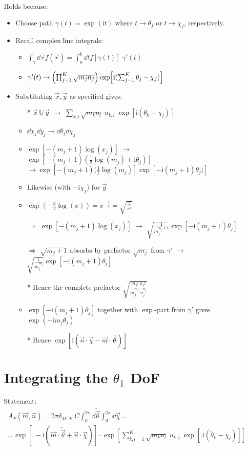 \documentclass[
	english,
	a4paper,
	fontsize=10pt,
	parskip=half,
	titlepage=true,
	DIV=12,
	final
]{scrreprt}
\newcommand*{\thus}{\ensuremath{\rightarrow}\xspace}
\newcommand*{\Thus}{\ensuremath{\Rightarrow}\xspace}
\newcommand*{\iunit}{\ensuremath{\mathrm{i}}}
\begin{document}
Holds because:
\begin{itemize}
\item Choose path $\gamma(t) = \exp(\iunit t)$ where $t \thus \theta_j$ or $t \thus \chi_j$,
	respectively.
\item Recall complex line integrals:
	\begin{itemize}
	\item $\int_{\gamma} \dd{\vec{r}} f(\vec{r})
		=
		\int_{a}^{b} \dd{t} f[\gamma(t)] \; \gamma'(t)$
	\item $\gamma'(t) 
		\thus 
	 	\qty( \prod_{j=1}^{K} \sqrt{m_j n_j} )
	 	\exp[\iunit(\sum_{j=1}^{K} \theta_j - \chi_j)]$
	\end{itemize}
\item Substituting $\vec{x}, \vec{y}$ as specified gives:
	\begin{itemize}
	\item[*] $\vec{x} \, \mathbb{U} \, \vec{y}$
		\thus
		$\sum_{k,l} \sqrt{m_k n_l} \; u_{k,l} \; \exp[\iunit(\theta_k - \chi_l)]$
	\item $\dd{x_j} \dd{y_j} \thus \dd{\theta_j} \dd{\chi_j}$
	\item $\exp[-(m_j + 1) \log(x_j)]$
		\thus
		$\exp[-(m_j + 1) (\frac{1}{2}\log(m_j) + \iunit \theta_j)]$\\
		$\thus
		 \exp[-(m_j + 1) (\frac{1}{2}\log(m_j)] \exp[ -\iunit (m_j + 1) \theta_j)]
		$
	\item Likewise (with $-\iunit \chi_j$) for $\vec{y}$
	\item $\exp(-\frac{a}{2} \log(x)) = x^{-\frac{a}{2}} = \sqrt{\frac{1}{x^{a}}}$
	\item[\Thus] $\exp[-(m_j + 1) \log(x_j)]$
		\thus
		$\sqrt{\frac{1}{ m_j^{m_j + 1}}} \exp[-\iunit (m_j + 1) \theta_j]$
	\item[\Thus] $\sqrt{m_j + 1}$ absorbs by prefactor $\sqrt{m_j}$ from $\gamma'$
		\thus $\sqrt{\frac{1}{ m_j^{m_j}}} \exp[-\iunit (m_j + 1)\theta_j]$
	\item[*] Hence the complete prefactor 
		$\sqrt{\frac
			{m_j!      \; n_j!}
			{m_j^{m_j} \; n_j^{n_j} }}$
	 \item $\exp[-\iunit (m_j + 1)\theta_j]$ together with $\exp$-part from $\gamma'$ gives
	 	$\exp(-\iunit m_j \theta_j)$
	 \item[*] Hence $\exp[\iunit(\vec{n} \cdot \vec{\chi}  -  \vec{m} \cdot \vec{\theta})]$
	\end{itemize}
\end{itemize}


\section{Integrating the $\theta_1$ DoF}
\label{sec:Inttheta1}
Statement:
\begin{multline}
	A_F(\vec{m}, \vec{n})
=
	2 \pi \delta_{M, N} \; C
	\int_{0}^{2\pi} \dd{\tilde{\vec{\theta}}}
	\int_{0}^{2\pi} \dd{\vec{\chi}} \ldots \\
		\ldots
		\exp[ \Bigg. -\iunit(\vec{m} \cdot \tilde{\vec{\theta}}  +  \vec{n} \cdot \vec{\chi})] \cdot
		\exp[ \sum_{k,l=1}^{K} \sqrt{m_k n_l} \; u_{k,l} \; 
			\exp[ \Big. \iunit(\tilde{\theta}_k - \chi_l)] 
		]
\label{eqn:AmplitudePreSPA}
\end{multline}
\end{document}
